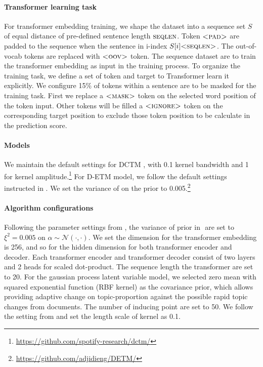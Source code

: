 \paragraph{Transformer learning task}
For transformer embedding training, we shape the dataset into a sequence set $ S $ of equal distance of pre-defined sentence length $ \textsc{seqlen} $. Token $ \textsc{<pad>} $ are padded to the sequence when the sentence in i-index $ S[i]\textsc{<seqlen>} $. The out-of-vocab tokens are replaced with $ \textsc{<oov>} $ token. The sequence dataset are to train the transformer embedding as input in the training process. To organize the training task, we define a set of token and target to Transformer learn it explicitly. We configure 15\% of tokens within a sentence are to be masked for the training task. First we replace a $ \textsc{<mask>} $ token on the selected word position of the token input. Other tokens will be filled a $ \textsc{<ignore>} $ token on the corresponding target position to exclude those token position to be calculate in the prediction score. 
\paragraph{Models}
We maintain the default settings for DCTM \cite{tomasi_stochastic_nodate}, with 0.1 kernel bandwidth and 1 for kernel amplitude.\footnote{\url{https://github.com/spotify-research/dctm/}}
For D-ETM model, we follow the default settings instructed in \cite{dieng_dynamic_2019}. We set the variance of  on the prior to 0.005.\footnote{\url{https://github.com/adjidieng/DETM/}}
\paragraph{Algorithm configurations}
Following the parameter settings from \cite{blei_dynamic_2006}, the variance of prior in $  $ are set to $ \xi^2=0.005 $ on $ \alpha\sim\mathcal{N}(\cdot,\cdot) $.
We set the dimension for the transformer embedding is 256, and so for the hidden dimension for both transformer encoder and decoder. Each transformer encoder and transformer decoder consist of two layers and 2 heads for scaled dot-product. The sequence length the transformer are set to 20.
For the gaussian process latent variable model, we selected zero mean with squared exponential function (RBF kernel) as the covariance prior, which allows providing adaptive change on topic-proportion against the possible rapid topic changes from documents. The number of inducing point are set to 50. We follow the setting from \cite{tomasi_stochastic_nodate} and set the length scale of kernel as 0.1.
